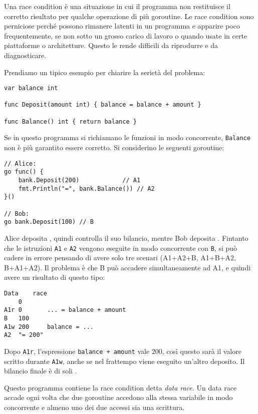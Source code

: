 \documentclass[../../thesis.tex]{subfiles}
\begin{document}
    Una race condition è una situazione in cui il programma non restituisce il corretto risultato per qualche operazione di più goroutine.
    Le race condition sono perniciose perché possono rimanere latenti in un programma e apparire poco frequentemente, se non sotto un grosso carico di lavoro o quando usate in certe piattaforme o architetture.
    Questo le rende difficili da riprodurre e da diagnosticare.
    \hfill \vspace{12pt}

    Prendiamo un tipico esempio per chiarire la serietà del problema:
    \begin{lstlisting}[frame = single,label={lst:lstlisting9-1.1}]
var balance int

func Deposit(amount int) { balance = balance + amount }

func Balance() int { return balance }
    \end{lstlisting}
    Se in questo programma si richiamano le funzioni in modo concorrente, \verb"Balance" non è più garantito essere corretto.
    Si considerino le seguenti goroutine:
    \begin{lstlisting}[frame = single,label={lst:lstlisting9-1.2}]
// Alice:
go func() {
    bank.Deposit(200)		     // A1
    fmt.Println("=", bank.Balance()) // A2
}()

// Bob:
go bank.Deposit(100) // B
    \end{lstlisting}
    Alice deposita , quindi controlla il suo bilancio, mentre Bob deposita .
    Fintanto che le istruzioni \verb"A1" e \verb"A2" vengono eseguite in modo concorrente con \verb"B", si può cadere in errore pensando di avere solo tre scenari (A1+A2+B, A1+B+A2, B+A1+A2).
    Il problema è che B può accadere simultaneamente ad A1, e quindi avere un risultato di questo tipo:
    \begin{lstlisting}[label={lst:lstlisting9-1.3}]
Data	race
	0
A1r	0		... = balance + amount
B	100
A1w	200		balance = ...
A2	"= 200"
    \end{lstlisting}
    Dopo \verb"A1r", l'espressione \verb"balance + amount" vale $200$, così questo sarà il valore scritto durante \verb"A1w", anche se nel frattempo viene eseguito un'altro deposito.
    Il bilancio finale è di soli .
    \hfill \vspace{12pt}

    Questo programma contiene la race condition detta \textit{data race}.
    Un data race accade ogni volta che due goroutine accedono alla stessa variabile in modo concorrente e almeno uno dei due accessi sia una scrittura.
    \hfill \vspace{12pt}
\end{document}
